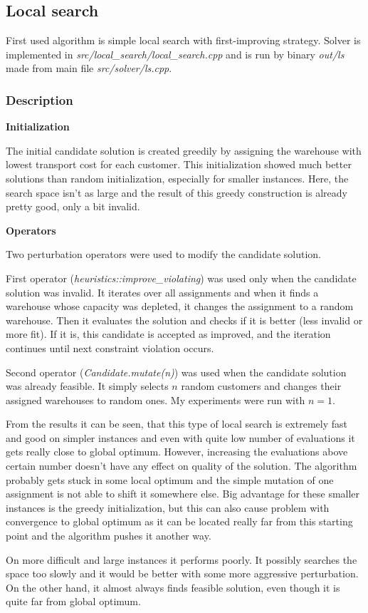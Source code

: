\documentclass[./main.tex]{subfiles}
\begin{document}
\subsection{Local search}
First used algorithm is simple local search with first-improving strategy.
Solver is implemented in \textit{src/local\_search/local\_search.cpp} and is run by binary \textit{out/ls} made from main file \textit{src/solver/ls.cpp}.

\subsubsection{Description}
\textbf{Initialization}

The initial candidate solution is created greedily by assigning the warehouse with lowest transport cost for each customer.
This initialization showed much better solutions than random initialization, especially for smaller instances.
Here, the search space isn't as large and the result of this greedy construction is already pretty good, only a bit invalid.

\textbf{Operators}

Two perturbation operators were used to modify the candidate solution.

First operator (\textit{heuristics::improve\_violating}) was used only when the candidate solution was invalid.
It iterates over all assignments and when it finds a warehouse whose capacity was depleted, it changes the assignment to a random warehouse.
Then it evaluates the solution and checks if it is better (less invalid or more fit).
If it is, this candidate is accepted as improved, and the iteration continues until next constraint violation occurs.

Second operator (\textit{Candidate.mutate(n)}) was used when the candidate solution was already feasible.
It simply selects $n$ random customers and changes their assigned warehouses to random ones.
My experiments were run with $n = 1$.

From the results it can be seen, that this type of local search is extremely fast and good on simpler instances and even with quite low number of evaluations it gets really close to global optimum.
However, increasing the evaluations above certain number doesn't have any effect on quality of the solution.
The algorithm probably gets stuck in some local optimum and the simple mutation of one assignment is not able to shift it somewhere else.
Big advantage for these smaller instances is the greedy initialization, but this can also cause problem with convergence to global optimum as it can be located really far from this starting point and the algorithm pushes it another way.

On more difficult and large instances it performs poorly.
It possibly searches the space too slowly and it would be better with some more aggressive perturbation.
On the other hand, it almost always finds feasible solution, even though it is quite far from global optimum.
\end{document}
